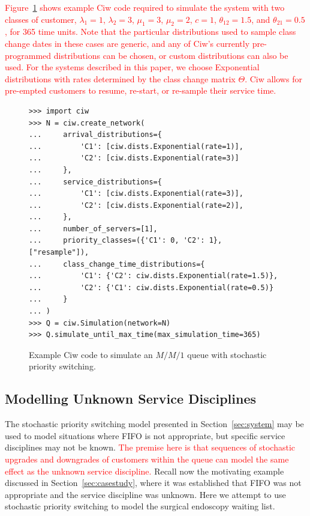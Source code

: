 \documentclass{article}
\begin{document}
\textcolor{red}{Figure~\ref{fig:ciwcode} shows example Ciw code required to
simulate the system with two classes of customer, $\lambda_1 = 1$,
$\lambda_2 = 3$, $\mu_1 = 3$, $\mu_2 = 2$, $c = 1$, $\theta_{12} =1.5$, and
$\theta_{21} = 0.5$, for 365 time units.
Note that the particular distributions used to sample class change dates in
these cases are generic, and any of Ciw's currently pre-programmed distributions
can be chosen, or custom distributions can also be used. For the systems
described in this paper, we choose Exponential distributions with rates
determined by the class change matrix $\Theta$. Ciw allows for 
pre-empted customers to resume, re-start, or re-sample their service time.}


\begin{figure}
\begin{verbatim}
>>> import ciw
>>> N = ciw.create_network(
...     arrival_distributions={
...         'C1': [ciw.dists.Exponential(rate=1)],
...         'C2': [ciw.dists.Exponential(rate=3)]
...     },
...     service_distributions={
...         'C1': [ciw.dists.Exponential(rate=3)],
...         'C2': [ciw.dists.Exponential(rate=2)],
...     },
...     number_of_servers=[1],
...     priority_classes=({'C1': 0, 'C2': 1}, ["resample"]),
...     class_change_time_distributions={
...         'C1': {'C2': ciw.dists.Exponential(rate=1.5)},
...         'C2': {'C1': ciw.dists.Exponential(rate=0.5)}
...     }
... )
>>> Q = ciw.Simulation(network=N)
>>> Q.simulate_until_max_time(max_simulation_time=365)
\end{verbatim}
\caption{Example Ciw code to simulate an $M/M/1$ queue with stochastic priority
switching.}
\label{fig:ciwcode}
\end{figure}


\subsection{Modelling Unknown Service Disciplines}\label{sec:modelling}
The stochastic priority switching model presented in Section~\ref{sec:system}
may be used to model situations where FIFO is not appropriate, but specific
service disciplines may not be known.
\textcolor{red}{The premise here is that sequences of stochastic upgrades and
downgrades of customers within the queue can model the same effect as the
unknown service discipline.}
Recall now the motivating example discussed in Section~\ref{sec:casestudy},
where it was established that FIFO was not appropriate and the service
discipline was unknown. Here we attempt to use stochastic priority switching to
model the surgical endoscopy waiting list.
\end{document}
